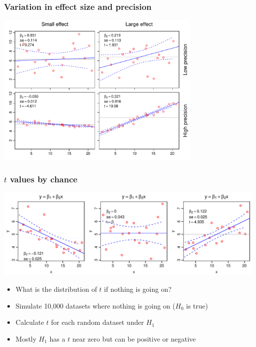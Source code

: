 \documentclass[aspectratio=43]{beamer}
\begin{document}
\begin{frame}[T]
\frametitle{Variation in effect size and precision}


	
		\centerline{\includegraphics[height=75mm]{T_examples.pdf}}


\end{frame}


\begin{frame}[T]
\frametitle{$t$ values by chance}

\includegraphics[width=\textwidth]{t_extremes.pdf}

\begin{itemize}
\item What is the distribution of $t$ if nothing is going on?
\item Simulate 10,000 datasets where nothing is going on ($H_0$ is true)
\item Calculate $t$ for each random dataset under $H_1$
\item Mostly $H_1$ has a $t$ near zero but can be positive or negative
\end{itemize}

\end{frame}

% 
\end{document}
